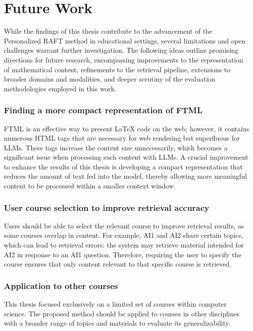 \section{Future Work}

While the findings of this thesis contribute to the advancement of the Personalized RAFT method in educational settings, several limitations and open challenges warrant further investigation. The following ideas outline promising directions for future research, encompassing improvements to the representation of mathematical content, refinements to the retrieval pipeline, extensions to broader domains and modalities, and deeper scrutiny of the evaluation methodologies employed in this work.

\subsubsection{Finding a more compact representation of FTML}
FTML is an effective way to present LaTeX code on the web; however, it contains numerous HTML tags that are necessary for web rendering but superfluous for LLMs. These tags increase the content size unnecessarily, which becomes a significant issue when processing such content with LLMs. A crucial improvement to enhance the results of this thesis is developing a compact representation that reduces the amount of text fed into the model, thereby allowing more meaningful content to be processed within a smaller context window.

\subsubsection{User course selection to improve retrieval accuracy}
Users should be able to select the relevant course to improve retrieval results, as some courses overlap in content. For example, AI1 and AI2 share certain topics, which can lead to retrieval errors: the system may retrieve material intended for AI2 in response to an AI1 question. Therefore, requiring the user to specify the course ensures that only content relevant to that specific course is retrieved.

\subsubsection{Application to other courses}
This thesis focused exclusively on a limited set of courses within computer science. The proposed method should be applied to courses in other disciplines with a broader range of topics and materials to evaluate its generalizability.

